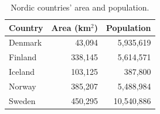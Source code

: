 \documentclass[a4paper]{article}
\begin{document}
\begin{table}[htb]
  \begin{center}
    \caption{Nordic countries' area and population.}
    \label{tbl:example2}
    \begin{tabular}{l|rr}
      Country & Area (km$^2$) & Population \\\hline
      Denmark & 43,094 & 5,935,619 \\
      Finland & 338,145 & 5,614,571 \\
      Iceland & 103,125 & 387,800 \\
      Norway  & 385,207 & 5,488,984 \\
      Sweden  & 450,295 & 10,540,886 \\
    \end{tabular}
  \end{center}
\end{table}


\printbibliography
\end{document}
